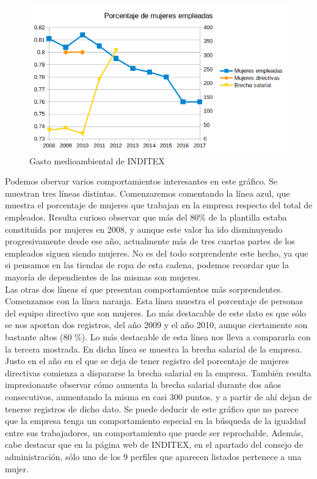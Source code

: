 \documentclass[11pt]{article}
\theoremstyle{plain}
\theoremstyle{definition}
\begin{document}
\begin{figure}[H]
  \centering \includegraphics[width=\textwidth]{graphs/social.png}
  \caption{Gasto medioambiental de INDITEX}
\end{figure}

Podemos obervar varios comportamientos interesantes en este gráfico.
Se muestran tres líneas distintas. Comenzaremos comentando la línea
azul, que muestra el porcentaje de mujeres que trabajan en la empresa
respecto del total de empleados. Resulta curioso observar que más del
80\% de la plantilla estaba constituida por mujeres en 2008, y aunque
este valor ha ido disminuyendo progresivamente desde ese año,
actualmente más de tres cuartas partes de los empleados siguen siendo
mujeres. No es del todo sorprendente este hecho, ya que si pensamos en
las tiendas de ropa de esta cadena, podemos recordar que
la mayoría de dependientes de las mismas son mujeres.\\

Las otras dos líneas sí que presentan comportamientos más
sorprendentes. Comenzamos con la línea naranja. Esta línea muestra el
porcentaje de personas del equipo directivo que son mujeres. Lo más
destacable de este dato es que sólo se nos aportan dos registros, del
año 2009 y el año 2010, aunque ciertamente son bastante altos (80 \%).
Lo más destacable de esta línea nos lleva a compararla con la tercera
mostrada. En dicha línea se muestra la brecha salarial de la empresa.
Justo en el año en el que se deja de tener registro del porcentaje de
mujeres directivas comienza a dispararse la brecha salarial en la
empresa. También resulta impresionante observar cómo aumenta la brecha
salarial durante dos años consecutivos, aumentando la misma en casi
300 puntos, y a partir de ahí dejan de tenerse registros de dicho
dato. Se puede deducir de este gráfico que no parece que la empresa
tenga un comportamiento especial en la búsqueda de la igualdad entre
sus trabajadores, un comportamiento que puede ser reprochable. Además,
cabe destacar que en la página web de INDITEX, en el apartado del
consejo de administración, sólo uno de los 9 perfiles que aparecen
listados pertenece a una mujer.\\
\end{document}
